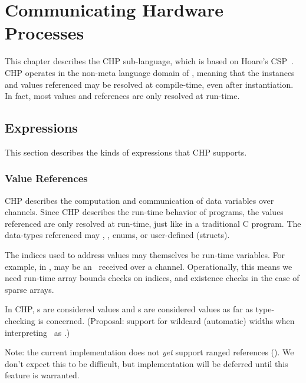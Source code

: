 

\chapter{Communicating Hardware Processes}
\label{sec:chp}

This chapter describes the CHP sub-language, which is based on
Hoare's CSP~\cite{ref:csp}.  
CHP operates in the non-meta language domain of \artxx, 
meaning that the instances and values referenced may be
resolved at compile-time, even after instantiation.  
In fact, most values and references are only resolved at run-time.  


\section{Expressions}
\label{sec:chp:expr}

This section describes the kinds of expressions that CHP supports.  

\subsection{Value References}
\label{sec:chp:expr:values}

CHP describes the computation and communication of data variables
over channels.  
Since CHP describes the run-time behavior of programs, 
the values referenced are only resolved at run-time, 
just like in a traditional C program.  
The data-types referenced may \bool, \int, enums, or user-defined (structs).  

The indices used to address values may themselves be run-time variables.  
For example, in ,  may be an \int\ received over a channel.  
Operationally, this means we need run-time array bounds checks on indices, 
and existence checks in the case of sparse arrays.  

In CHP, \pint s are considered \int{} values and
\pbool s are considered \bool values as far as type-checking is concerned.  
(Proposal: support for wildcard (automatic) widths when interpreting
\pint\ as \int.)  

Note: the current implementation does not \emph{yet} support ranged
references (). 
We don't expect this to be difficult, but implementation will be deferred
until this feature is warranted.  

